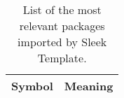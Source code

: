 

\begin{table}[h]
    \centering
    \begin{tabular}{ll}
        \toprule
        \textbf{Symbol} & \textbf{Meaning} \\
        \midrule
        \bottomrule
    \end{tabular}
    \caption{List of the most relevant packages imported by Sleek Template.}
    \label{tab:sleek_relevant_packages}
\end{table}